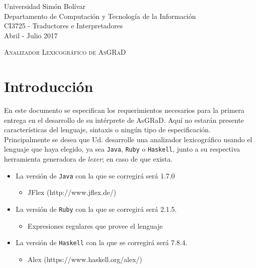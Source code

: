 \documentclass[letterpaper,10pt]{article}
\newcommand{\asgrad}{AsGRaD\xspace}
\newcommand{\ttt}[1]{\texttt{#1}}
\begin{document}
\begin{flushleft}
{\small
Universidad Simón Bolívar\\
Departamento de Computación y Tecnología de la Información\\
CI3725 - Traductores e Interpretadores\\
Abril - Julio 2017\\
}
\end{flushleft}

\vspace{1em}

\begin{center}
{\Large
\textsc{Analizador Lexicográfico de \asgrad}
}
\end{center}

\vspace{1em}

\section{Introducción}

En este documento se especifican los requerimientos necesarios para la primera entrega en el desarrollo de su intérprete de \asgrad. Aquí no estarán presente características del lenguaje, sintaxis o ningún tipo de especificación. Principalmente se desea que Ud. desarrolle una analizador lexicográfico usando el lenguaje que haya elegido, ya sea \ttt{Java}, \ttt{Ruby} o \ttt{Haskell}, junto a su respectiva herramienta generadora de \textit{lexer}; en caso de que exista.

\begin{itemize}
    \item La versión de \ttt{Java} con la que se corregirá será 1.7.0
        \begin{itemize}
            \item JFlex (http://www.jflex.de/)
        \end{itemize}
    \item La versión de \ttt{Ruby} con la que se corregirá será 2.1.5.
        \begin{itemize}
            \item Expresiones regulares que provee el lenguaje
        \end{itemize}
    \item La versión de \ttt{Haskell} con la que se corregirá será 7.8.4.
        \begin{itemize}
            \item Alex (https://www.haskell.org/alex/)
        \end{itemize}
\end{itemize}
\end{document}
